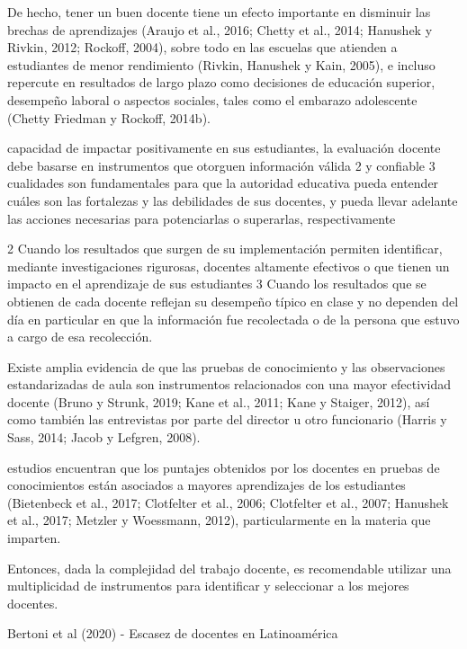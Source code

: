 De hecho, tener un buen docente tiene un efecto importante en disminuir las brechas de aprendizajes (Araujo et al., 2016; Chetty et al., 2014; Hanushek y Rivkin, 2012; Rockoff, 2004), sobre todo en las escuelas que atienden a estudiantes de menor rendimiento (Rivkin, Hanushek y Kain, 2005), e incluso repercute en resultados de largo plazo como decisiones de educación superior, desempeño laboral o aspectos sociales, tales como el embarazo adolescente
(Chetty Friedman y Rockoff, 2014b).

capacidad de impactar positivamente en sus estudiantes, la evaluación docente debe basarse en
instrumentos que otorguen información válida 2 y confiable 3 cualidades son fundamentales para que la autoridad educativa pueda entender cuáles son las fortalezas y las debilidades de sus docentes, y pueda llevar adelante las acciones necesarias para potenciarlas o superarlas, respectivamente

2 Cuando los resultados que surgen de su implementación permiten identificar, mediante investigaciones rigurosas, docentes altamente efectivos o que tienen un impacto en el aprendizaje de sus estudiantes
3 Cuando los resultados que se obtienen de cada docente reflejan su desempeño típico en clase y no dependen del día en particular en que la información fue recolectada o de la persona que estuvo a cargo de esa recolección.


Existe amplia evidencia de que las pruebas de conocimiento y las observaciones estandarizadas de aula son instrumentos relacionados con una mayor efectividad docente (Bruno y Strunk, 2019; Kane et al., 2011; Kane y Staiger, 2012), así como también las entrevistas por parte del director u otro funcionario (Harris y Sass, 2014; Jacob y Lefgren, 2008).


estudios encuentran que los puntajes obtenidos por los docentes en pruebas de conocimientos están asociados a mayores aprendizajes de los estudiantes (Bietenbeck et al., 2017; Clotfelter et al., 2006; Clotfelter et al., 2007; Hanushek et al., 2017; Metzler y Woessmann, 2012), particularmente en la materia que imparten.


Entonces, dada la complejidad del trabajo docente, es recomendable utilizar una multiplicidad de instrumentos para identificar y seleccionar a los mejores docentes.



Bertoni et al (2020) - Escasez de docentes en Latinoamérica

